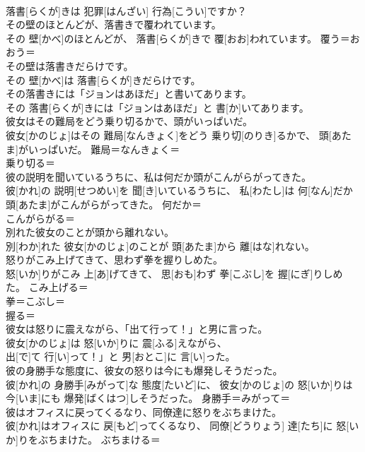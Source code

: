 \documentclass[8pt]{extreport}
\begin{document}
\begin{CJK}{UTF8}{min}
\\	落書[らくが]きは 犯罪[はんざい] 行為[こうい]ですか？	
\\	その壁のほとんどが、落書きで覆われています。	
\\	その 壁[かべ]のほとんどが、 落書[らくが]きで 覆[おお]われています。	覆う＝おおう＝ 
\\	その壁は落書きだらけです。	
\\	その 壁[かべ]は 落書[らくが]きだらけです。	
\\	その落書きには「ジョンはあほだ」と書いてあります。	
\\	その 落書[らくが]きには「ジョンはあほだ」と 書[か]いてあります。	
\\	彼女はその難局をどう乗り切るかで、頭がいっぱいだ。	
\\	彼女[かのじょ]はその 難局[なんきょく]をどう 乗り切[のりき]るかで、 頭[あたま]がいっぱいだ。	難局＝なんきょく＝ 
\\	乗り切る＝ 
\\	彼の説明を聞いているうちに、私は何だか頭がこんがらがってきた。	
\\	彼[かれ]の 説明[せつめい]を 聞[き]いているうちに、 私[わたし]は 何[なん]だか 頭[あたま]がこんがらがってきた。	何だか＝ 
\\	こんがらがる＝ 
\\	別れた彼女のことが頭から離れない。	
\\	別[わか]れた 彼女[かのじょ]のことが 頭[あたま]から 離[はな]れない。	
\\	怒りがこみ上げてきて、思わず拳を握りしめた。	
\\	怒[いか]りがこみ 上[あ]げてきて、 思[おも]わず 拳[こぶし]を 握[にぎ]りしめた。	こみ上げる＝ 
\\	拳＝こぶし＝ 
\\	握る＝ 
\\	彼女は怒りに震えながら、「出て行って！」と男に言った。	
\\	彼女[かのじょ]は 怒[いか]りに 震[ふる]えながら、
\\	出[で]て 行[い]って！」と 男[おとこ]に 言[い]った。	
\\	彼の身勝手な態度に、彼女の怒りは今にも爆発しそうだった。	
\\	彼[かれ]の 身勝手[みがって]な 態度[たいど]に、 彼女[かのじょ]の 怒[いか]りは 今[いま]にも 爆発[ばくはつ]しそうだった。	身勝手＝みがって＝ 
\\	彼はオフィスに戻ってくるなり、同僚達に怒りをぶちまけた。	
\\	彼[かれ]はオフィスに 戻[もど]ってくるなり、 同僚[どうりょう] 達[たち]に 怒[いか]りをぶちまけた。	ぶちまける＝ 

\end{CJK}
\end{document}
